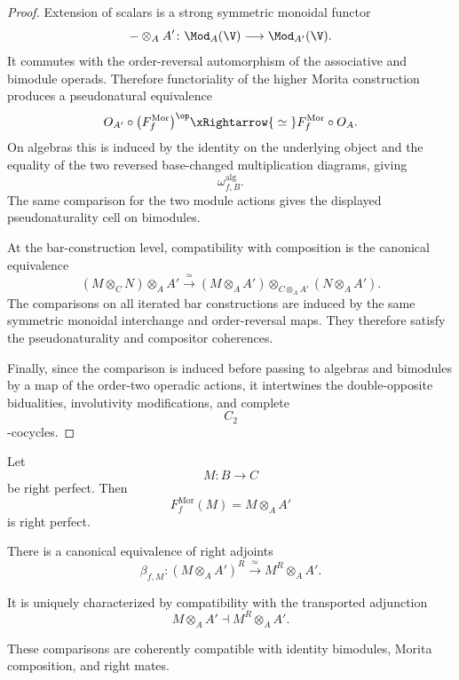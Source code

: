 \begin{proof}
Extension of scalars is a strong symmetric monoidal functor
\[
    -\otimes_A A'
    \colon
    \Mod_A(\V)
    \longrightarrow
    \Mod_{A'}(\V).
\]
It commutes with the order-reversal automorphism of the associative and
bimodule operads. Therefore functoriality of the higher Morita
construction produces a pseudonatural equivalence
\[
    O_{A'}
    \circ
    \bigl(F_f^{\mathrm{Mor}}\bigr)^{\op}
    \xRightarrow{\;\simeq\;}
    F_f^{\mathrm{Mor}}
    \circ
    O_A.
\]
On algebras this is induced by the identity on the underlying object and
the equality of the two reversed base-changed multiplication diagrams,
giving
\[
    \omega_{f,B}^{\mathrm{alg}}.
\]
The same comparison for the two module actions gives the displayed
pseudonaturality cell on bimodules.

At the bar-construction level, compatibility with composition is the
canonical equivalence
\[
    (M\otimes_C N)\otimes_A A'
    \xrightarrow{\;\simeq\;}
    (M\otimes_A A')
    \otimes_{C\otimes_A A'}
    (N\otimes_A A').
\]
The comparisons on all iterated bar constructions are induced by the
same symmetric monoidal interchange and order-reversal maps. They
therefore satisfy the pseudonaturality and compositor coherences.

Finally, since the comparison is induced before passing to algebras and
bimodules by a map of the order-two operadic actions, it intertwines the
double-opposite bidualities, involutivity modifications, and complete
\[
    C_2
\]
-cocycles.
\end{proof}

\begin{proposition}
\label{prop:base-change-morita-adjoints}
Let
\[
    M
    \colon
    B
    \longrightarrow
    C
\]
be right perfect. Then
\[
    F_f^{\mathrm{Mor}}(M)
    =
    M\otimes_A A'
\]
is right perfect.

There is a canonical equivalence of right adjoints
\[
    \beta_{f,M}
    \colon
    (M\otimes_A A')^R
    \xrightarrow{\;\simeq\;}
    M^R\otimes_A A'.
\]

It is uniquely characterized by compatibility with the transported
adjunction
\[
    M\otimes_A A'
    \dashv
    M^R\otimes_A A'.
\]

These comparisons are coherently compatible with identity bimodules,
Morita composition, and right mates.
\end{proposition}


